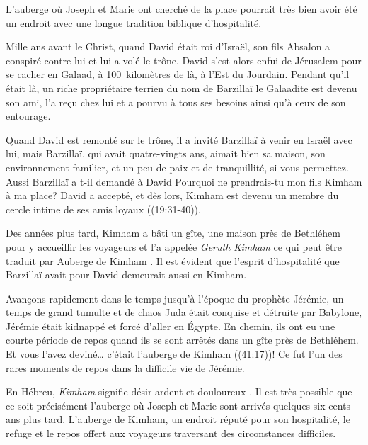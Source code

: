 

L'auberge où Joseph et Marie ont cherché de la place pourrait très bien avoir été un endroit avec une longue tradition biblique d'hospitalité.

Mille ans avant le Christ, quand David était roi d'Israël, son fils Absalon a conspiré contre lui et lui a volé le trône. David s'est alors enfui de Jérusalem pour se cacher en Galaad, à 100~kilomètres de là, à l'Est du Jourdain. Pendant qu'il était là, un riche propriétaire terrien du nom de Barzillaï le Galaadite est devenu son ami, l'a reçu chez lui et a pourvu à tous ses besoins ainsi qu'à ceux de son entourage.

Quand David est remonté sur le trône, il a invité Barzillaï à venir en Israël avec lui, mais Barzillaï, qui avait quatre-vingts ans, aimait bien sa maison, son environnement familier, \Og et un peu de paix et de tranquillité, si vous permettez. \Fg{} Aussi Barzillaï a t-il demandé à David\frcolon{} \Og Pourquoi ne prendrais-tu mon fils Kimham à ma place? \Fg{} David a accepté, et dès lors, Kimham est devenu un membre du cercle intime de ses amis loyaux ((19:31-40)).

Des années plus tard, Kimham a bâti un gîte, une maison près de Bethléhem pour y accueillir les voyageurs et l'a appelée \emph{Geruth Kimham} ce qui peut être traduit par \Og Auberge de Kimham \Fg{}. Il est évident que l'esprit d'hospitalité que Barzillaï avait pour David demeurait aussi en Kimham.

Avançons rapidement dans le temps jusqu'à l'époque du prophète Jérémie, un temps de grand tumulte et de chaos \ocadr Juda était conquise et détruite par Babylone, Jérémie était kidnappé et forcé d'aller en Égypte. En chemin, ils ont eu une courte période de repos quand ils se sont arrêtés dans un gîte près de Bethléhem. Et vous l'avez deviné\dots{} c'était l'auberge de Kimham ((41:17))! Ce fut l'un des rares moments de repos dans la difficile vie de Jérémie.

En Hébreu, \emph{Kimham} signifie \Og désir ardent et douloureux \Fg{}. Il est très possible que ce soit précisément l'auberge où Joseph et Marie sont arrivés quelques six cents ans plus tard. L'auberge de Kimham, un endroit r\'eput\'e pour son hospitalité, le refuge et le repos offert aux voyageurs traversant des circonstances difficiles.

